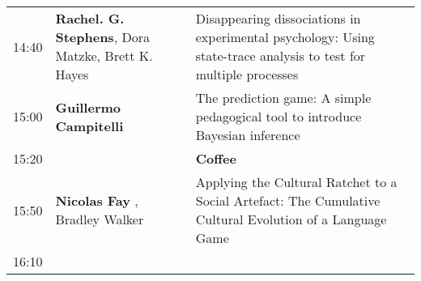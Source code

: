 \documentclass[]{article}
\begin{document}
\begin{longtable}[]{@{}lll@{}}
\begin{minipage}[t]{0.03\columnwidth}\raggedright\strut
14:40\strut
\end{minipage} & \begin{minipage}[t]{0.39\columnwidth}\raggedright\strut
\textbf{Rachel. G. Stephens}, Dora Matzke, Brett K. Hayes\strut
\end{minipage} & \begin{minipage}[t]{0.50\columnwidth}\raggedright\strut
Disappearing dissociations in experimental psychology: Using state-trace
analysis to test for multiple processes\strut
\end{minipage}\tabularnewline
\begin{minipage}[t]{0.03\columnwidth}\raggedright\strut
15:00\strut
\end{minipage} & \begin{minipage}[t]{0.39\columnwidth}\raggedright\strut
\textbf{Guillermo Campitelli}\strut
\end{minipage} & \begin{minipage}[t]{0.50\columnwidth}\raggedright\strut
The prediction game: A simple pedagogical tool to introduce Bayesian
inference\strut
\end{minipage}\tabularnewline
\begin{minipage}[t]{0.03\columnwidth}\raggedright\strut
15:20\strut
\end{minipage} & \begin{minipage}[t]{0.39\columnwidth}\raggedright\strut
\strut
\end{minipage} & \begin{minipage}[t]{0.50\columnwidth}\raggedright\strut
\textbf{Coffee}\strut
\end{minipage}\tabularnewline
\begin{minipage}[t]{0.03\columnwidth}\raggedright\strut
15:50\strut
\end{minipage} & \begin{minipage}[t]{0.39\columnwidth}\raggedright\strut
\textbf{Nicolas Fay} , Bradley Walker\strut
\end{minipage} & \begin{minipage}[t]{0.50\columnwidth}\raggedright\strut
Applying the Cultural Ratchet to a Social Artefact: The Cumulative
Cultural Evolution of a Language Game\strut
\end{minipage}\tabularnewline
\begin{minipage}[t]{0.03\columnwidth}\raggedright\strut
16:10\strut
\end{minipage} & \begin{minipage}[t]{0.39\columnwidth}\raggedright\strut

\end{minipage}
\end{longtable}
\end{document}
